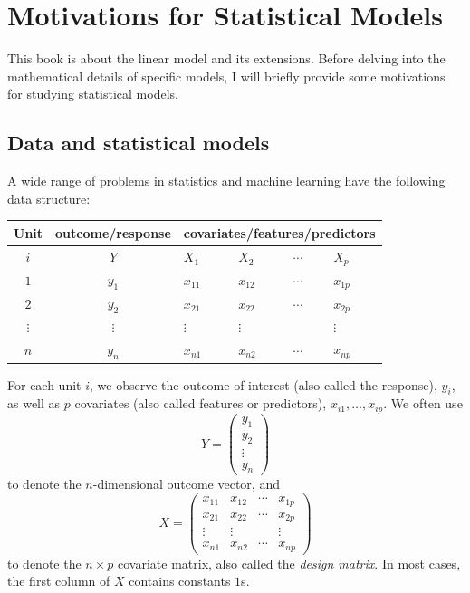  
\chapter{Motivations for Statistical Models}\label{chapter::motivation}




This book is about the linear model and its extensions. Before delving into the mathematical details of specific models, I will briefly provide some motivations for studying statistical models. 

 

\section{Data and statistical models}
A wide range of problems in statistics and machine learning have the following data structure: 

 
\begin{tabular}{|c|c|p{1cm}|p{1cm}|p{1cm}|p{1cm}|}
Unit & outcome/response & \multicolumn{4}{c|}{covariates/features/predictors}\tabularnewline
\hline 
\hline 
$i$ & $Y$ & $X_{1}$ & $X_{2}$ & $\cdots$ & $X_{p}$\tabularnewline
\hline 
$1$ & $y_{1}$ & $x_{11}$ & $x_{12}$ & $\cdots$ & $x_{1p}$\tabularnewline
\hline 
$2$ & $y_{2}$ & $x_{21}$ & $x_{22}$ & $\cdots$ & $x_{2p}$\tabularnewline
\hline 
$\vdots$ & $\vdots$ & $\vdots$ & $\vdots$ &  & $\vdots$\tabularnewline
\hline 
$n$ & $y_{n}$ & $x_{n1}$ & $x_{n2}$ & $\cdots$ & $x_{np}$\tabularnewline
\end{tabular}
 
 
For each unit $i$, we observe the outcome of interest (also called the response), $y_i$, as well as $p$  covariates (also called features or predictors), $x_{i1}, \ldots, x_{ip}$. 
We often use 
\[
Y=\left(\begin{array}{c}
y_{1}\\
y_{2}\\
\vdots\\
y_{n}
\end{array}\right)
\]
to denote the $n$-dimensional outcome vector, and 
\[
X=\left(\begin{array}{cccc}
x_{11} & x_{12} & \cdots & x_{1p}\\
x_{21} & x_{22} & \cdots & x_{2p}\\
\vdots & \vdots &  & \vdots\\
x_{n1} & x_{n2} & \cdots & x_{np}
\end{array}\right)
\]
to denote the $n\times p$ covariate matrix, also called the {\it design matrix}. In
most cases, the first column of $X$ contains constants $1$s. 

